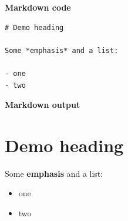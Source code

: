 \par\medskip\noindent\textbf{Markdown code}\par\nopagebreak
\begin{verbatim}
# Demo heading

Some *emphasis* and a list:

- one
- two
\end{verbatim}

\noindent\textbf{Markdown output}\par\nopagebreak
\section{Demo heading}

Some \textbf{emphasis} and a list:

\begin{itemize}
\item one
\item two
\end{itemize}
\par\medskip

